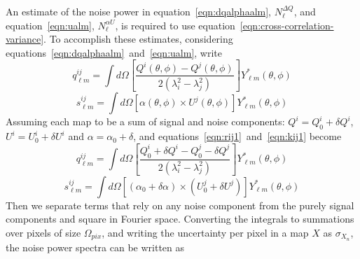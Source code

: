 \documentclass[usenatbib,hidelinks]{mnras}
\begin{document}
{{An estimate of the noise power in equation~\ref{eqn:dqalphaalm}, $N_{\ell}^{\Delta Q}$, and equation~\ref{eqn:ualm}, $N_{\ell}^{\alpha U}$, is required to use equation~\ref{eqn:cross-correlation-variance}.
To accomplish these estimates, considering equations~\ref{eqn:dqalphaalm}~and~\ref{eqn:ualm}, write
\begin{equation} 
q^{ij}_{\ell m} = \int d\Omega \left[  \frac{Q^{i}(\theta,\phi) - Q^{j}(\theta,\phi)}{2 \left(\lambda_{i}^{2}-\lambda_{j}^{2}\right)}\right] Y^{*}_{\ell m}(\theta,\phi)  \label{eqn:rij1}
\end{equation}
\begin{equation}
s^{ij}_{\ell m} = \int d\Omega \left[ \alpha(\theta,\phi) \times U^{j}(\theta,\phi) \right] Y^{*}_{\ell m}(\theta,\phi)  \label{eqn:kij1}
\end{equation}
Assuming each map to be a sum of signal and noise components: $Q^{i} = Q^{i}_{0}+\delta Q^{i}$, $U^{i} = U^{i}_{0}+\delta U^{i}$ and  $\alpha = \alpha_{0}+\delta$, and equations~\ref{eqn:rij1}~and~\ref{eqn:kij1} become
\begin{equation}
q^{ij}_{\ell m} = \int d\Omega \left[  \frac{ Q^{i}_{0}+\delta Q^{i}  - Q^{j}_{0} - \delta Q^{j} }{2 \left( \lambda_{i}^{2}-\lambda_{j}^{2} \right) }\right] Y^{*}_{\ell m}(\theta,\phi)  \label{eqn:rij2}
\end{equation}
\begin{equation}
s^{ij}_{\ell m} = \int d\Omega \left[ (\alpha_{0} + \delta \alpha) \times (U^{j}_{0} +\delta U^{j}) \right] Y^{*}_{\ell m}(\theta,\phi)  \label{eqn:kij2}
\end{equation}
Then we separate terms that rely on any noise component
from the purely signal components and square in Fourier space.
Converting the integrals to summations over pixels of size $\Omega_{pix}$, and writing the uncertainty per pixel in a map $X$ as $\sigma_{X_{n}}$, the noise power spectra can be written as


}}
\end{document}
